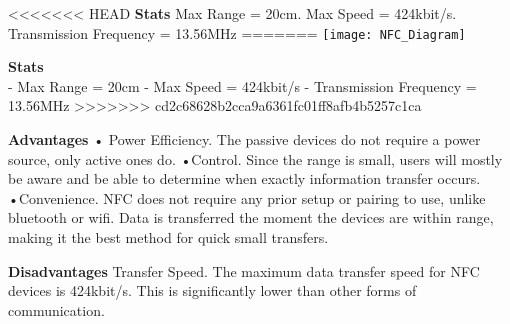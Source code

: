 \documentclass[a0paper,portrait]{baposter}
\begin{document}
\begin{poster}
{<<<<<<< HEAD
\textbf{Stats}
Max Range = 20cm. Max Speed = 424kbit/s. Transmission Frequency = 13.56MHz
=======
{\texttt{[image: NFC\_Diagram]}}

\textbf{Stats}\\
- Max Range = 20cm 
- Max Speed = 424kbit/s
- Transmission Frequency = 13.56MHz
>>>>>>> cd2c68628b2cca9a6361fc01ff8afb4b5257c1ca

\textbf{Advantages}
• Power Efficiency. The passive devices do not require a power source, only active ones do.
•Control. Since the range is small, users will mostly be aware and be able to determine when exactly information transfer occurs.
•Convenience. NFC does not require any prior setup or pairing to use, unlike bluetooth or wifi. Data is transferred the moment the devices are within range, making it the best method for quick small transfers.

\textbf{Disadvantages}
Transfer Speed. The maximum data transfer speed for NFC devices is 424kbit/s. This is significantly lower than other forms of communication. 

}


\end{poster}
\end{document}
